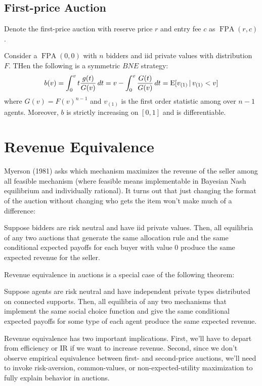 \documentclass[10pt]{article}
\DeclareMathOperator{\FPA}{FPA}
\begin{document}
\begin{spacing}{1.0}
\subsection{First-price Auction}

Denote the first-price auction with reserve price $r$ and
entry fee $c$ as $\FPA(r,c)$.

\begin{theorem}[Symmetric Equilibrium in $\FPA(0,0)$]
  Consider a $\FPA(0,0)$ with $n$ bidders and iid
  private values with distribution $F$. THen the
  following is a symmetric $BNE$ strategy:
  \begin{equation}
    \label{eq:1}
    b(v) = \int_0^v t \frac{g(t)}{G(v)}\,dt = v -
    \int_0^v \frac{G(t)}{G(v)}\, dt = \operatorname{E}[v_{(1)}\,|\,v_{(1)}<v]
  \end{equation}
  where $G(v) = F(v)^{n-1}$ and $v_{(1)}$ is the first
  order statistic among over $n-1$ agents. Moreover, $b$
  is strictly increasing on $[0,1]$ and is
  differentiable.
\end{theorem}

\section{Revenue Equivalence}

Myerson (1981) asks which mechanism maximizes the revenue of the seller
among all feasible mechanism (where feasible means implementable in
Bayesian Nash equilibrium and individually rational). It turns out that
just changing the format of the auction without changing who gets the item
won't make much of a difference:

\begin{theorem}
  Suppose bidders are risk neutral and have iid private
  values. Then, all equilibria of any two auctions that generate
  the same allocation rule and the same conditional
  expected payoffs for each buyer with value $0$ produce
  the same expected revenue for the seller.
\end{theorem}
Revenue equivalence in auctions is a special case of the following theorem:
\begin{theorem}
  Suppose agents are risk neutral and have independent private types
  distributed on connected supports. Then, all equilibria of any two
  mechanisms that implement the same social choice function and give the
  same conditional expected payoffs for some type of each agent produce
  the same expected revenue.
\end{theorem}
Revenue equivalence has two important implications. First, we'll have to
depart from efficiency or IR if we want to increase revenue. Second, since
we don't observe empirical equivalence between first- and second-price
auctions, we'll need to invoke risk-aversion, common-values, or
non-expected-utility maximization to fully explain behavior in auctions.


\end{spacing}
\end{document}
